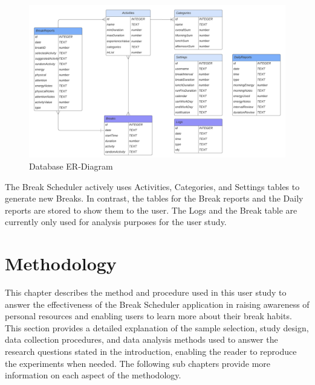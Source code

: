 \documentclass{hasel_thesis}
\begin{document}
\begin{figure}[htp]
    \centering
    \includegraphics[width=15cm]{hasel_thesis/images/db.png}
    \caption{Database ER-Diagram}
    \label{fig:db}
\end{figure}

The Break Scheduler actively uses Activities, Categories, and Settings tables to generate new Breaks. In contrast, the tables for the Break reports and the Daily reports are stored to show them to the user. The Logs and the Break table are currently only used for analysis purposes for the user study.

\chapter{Methodology}
This chapter describes the method and procedure used in this user study to answer the effectiveness of the Break Scheduler application in raising awareness of personal resources and enabling users to learn more about their break habits. This section provides a detailed explanation of the sample selection, study design, data collection procedures, and data analysis methods used to answer the research questions stated in the introduction, enabling the reader to reproduce the experiments when needed. The following sub chapters provide more information on each aspect of the methodology.
\end{document}
